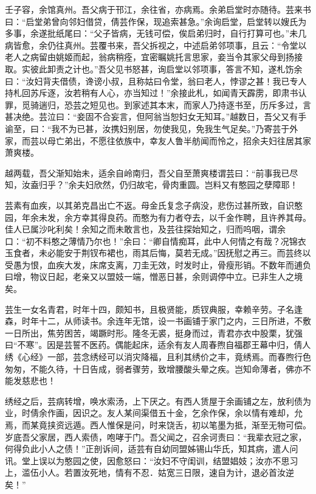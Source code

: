 \documentclass[]{article}
\begin{document}
壬子容，余馆真州。吾父病于邗江，余往省，亦病焉。余弟启堂时亦随待。芸来书曰：``启堂弟曾向邻妇借贷，倩芸作保，现追索甚急。''余询启堂，启堂转以嫂氏为多事，余遂批纸尾曰：``父子皆病，无钱可偿，俟启弟归时，自行打算可也。''未几病皆愈，余仍往真州。芸覆书来，吾父拆视之，中述启弟邻项事，且云：``令堂以老人之病留由姚姬而起，翁病稍痊，宜密瞩姚托言思家，妾当令其家父母到扬接取。实彼此卸责之计也。''吾父见书怒甚，询启堂以邻项事，答言不知，遂札饬余曰：``汝妇背夫借债，谗谤小叔，且称姑曰令堂，翁曰老人，悖谬之甚！我已专人持札回苏斥逐，汝若稍有人心，亦当知过！''余接此札，如闻青天霹雳，即肃书认罪，觅骑遄归，恐芸之短见也。到家述其本末，而家人乃持逐书至，历斥多过，言甚决绝。芸泣曰：``妾固不合妄言，但阿翁当恕妇女无知耳。''越数日，吾父又有手谕至，曰：``我不为已甚，汝携妇别居，勿使我见，免我生气足矣。''乃寄芸于外家，而芸以母亡弟出，不愿往依族中，幸友人鲁半舫闻而怜之，招余夫妇往居其家萧爽楼。

越两载，吾父渐知始未，适余自岭南归，吾父自至萧爽楼谓芸曰：``前事我已尽知，汝盍归乎？''余夫妇欣然，仍归故宅，骨肉重圆。岂料又有憨园之孽障耶！

芸素有血疾，以其弟克昌出亡不返。母金氏复念子病没，悲伤过甚所致，自识憨园，年余未发，余方幸其得良药。而憨为有力者夺去，以千金作聘，且许养其母。佳人已属沙叱利矣！余知之而未敢言也，及芸往探始知之，归而呜咽，谓余口：``初不料憨之薄情乃尔也！''余曰：``卿自情痴耳，此中人何情之有哉？况锦衣玉食者，未必能安于荆钗布裙也，雨其后悔，莫若无成。''因抚慰之再三。而芸终以受愚为恨，血疾大发，床席支离，刀圭无效，时发时止，骨瘦形销。不数年而逋负曰增，物议日起，老亲又以盟妓一端，憎恶日甚，余则调停中立。已非生人之境矣。

芸生一女名青君，时年十四，颇知书，且极贤能，质钗典服，幸赖辛劳。子名逢森，时年十二，从师读书。余连年无馆，设一书画铺于家门之内，三日所进，不敷一日所出，焦劳困苦，竭蹶时形。隆冬无裘，挺身而过，青君亦衣中股栗，犹强曰``不寒''。因是芸誓不医药。偶能起床，适余有友人周春煦自福郡王幕中归，倩人绣《心经》一部，芸念绣经可以消灾降福，且利其绣价之丰，竟绣焉。而春煦行色匆匆，不能久待，十日告成，弱者骤劳，致增腰酸头晕之疾。岂知命薄者，佛亦不能发慈悲也！

绣经之后，芸病转增，唤水索汤，上下厌之。有西人赁屋于余画铺之左，放利债为业，时倩余作画，因识之。友人某间渠借五十金，乞余作保，余以情有难却，允焉，而某竟挟资远遁。西人惟保是问，时来饶舌，初以笔墨为抵，渐至无物可偿。岁底吾父家居，西人索债，咆哮于门。吾父闻之，召余诃责曰：``我辈衣冠之家，何得负此小人之债！''正剖诉间，适芸有自幼同盟姊锡山华氏，知其病，遣人问讯。堂上误以为憨园之使，因愈怒曰：``汝妇不守闺训，结盟娼妓；汝亦不思习上，滥伍小人。若置汝死地，情有不忍．姑宽三日限，速自为计，退必首汝逆矣！''
\end{document}
